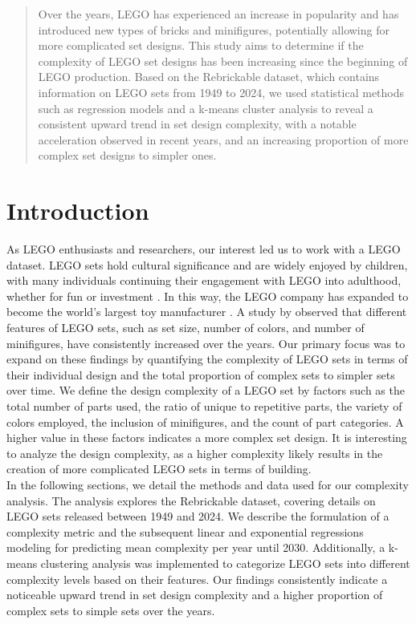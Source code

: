 \documentclass{article}
\theoremstyle{plain}
\theoremstyle{definition}
\theoremstyle{remark}
\begin{document}
\begin{abstract}
Over the years, LEGO has experienced an increase in popularity and has introduced new types of bricks and minifigures, potentially allowing for more complicated set designs. This study aims to determine if the complexity of LEGO set designs has been increasing since the beginning of LEGO production. Based on the Rebrickable dataset, which contains information on LEGO sets from 1949 to 2024, we used statistical methods such as regression models and a k-means cluster analysis to reveal a consistent upward trend in set design complexity, with a notable acceleration observed in recent years, and an increasing proportion of more complex set designs to simpler ones.

\end{abstract}

\section{Introduction}\label{sec:intro}
As LEGO enthusiasts and researchers, our interest led us to work with a LEGO dataset. LEGO sets hold cultural significance and are widely enjoyed by children, with many individuals continuing their engagement with LEGO into adulthood, whether for fun or investment \cite{dobrynskaya2018LEGO}. In this way, the LEGO company has expanded to become the world's largest toy manufacturer \cite{mazzarella2019let}. A study by \citet{legocomplexity} observed that different features of LEGO sets, such as set size, number of colors, and number of minifigures, have consistently increased over the years. Our primary focus was to expand on these findings by quantifying the complexity of LEGO sets in terms of their individual design and the total proportion of complex sets to simpler sets over time. We define the design complexity of a LEGO set by factors such as the total number of parts used, the ratio of unique to repetitive parts, the variety of colors employed, the inclusion of minifigures, and the count of part categories. A higher value in these factors indicates a more complex set design. It is interesting to analyze the design complexity, as a higher complexity likely results in the creation of more complicated LEGO sets in terms of building.\\
In the following sections, we detail the methods and data used for our complexity analysis. The analysis explores the Rebrickable dataset, covering details on LEGO sets released between 1949 and 2024. We describe the formulation of a complexity metric and the subsequent linear and exponential regressions modeling for predicting mean complexity per year until 2030. Additionally, a k-means clustering analysis was implemented to categorize LEGO sets into different complexity levels based on their features. Our findings consistently indicate a noticeable upward trend in set design complexity and a higher proportion of complex sets to simple sets over the years.
\end{document}
